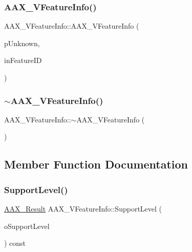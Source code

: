 \subsubsection{\texorpdfstring{AAX\_VFeatureInfo()}{AAX\_VFeatureInfo()}}
{\footnotesize\ttfamily A\+A\+X\+\_\+\+V\+Feature\+Info\+::\+A\+A\+X\+\_\+\+V\+Feature\+Info (\begin{DoxyParamCaption}\item[{\mbox{\hyperlink{a01409}{I\+A\+C\+F\+Unknown}} $\ast$}]{p\+Unknown,  }\item[{const \mbox{\hyperlink{a00392_a53d6cf8a08224b3e813333e411ce798e}{A\+A\+X\+\_\+\+Feature\+\_\+\+U\+ID}} \&}]{in\+Feature\+ID }\end{DoxyParamCaption})\hspace{0.3cm}{\ttfamily [explicit]}}

\mbox{\label{a01917_a96dc62d63f238e0d1c1778c7da749f0a}} 
\subsubsection{\texorpdfstring{$\sim$AAX\_VFeatureInfo()}{~AAX\_VFeatureInfo()}}
{\footnotesize\ttfamily A\+A\+X\+\_\+\+V\+Feature\+Info\+::$\sim$\+A\+A\+X\+\_\+\+V\+Feature\+Info (\begin{DoxyParamCaption}{ }\end{DoxyParamCaption})}



\subsection{Member Function Documentation}
\mbox{\label{a01917_ad801aa95cc3b8956ca589e28d58acbc7}} 
\subsubsection{\texorpdfstring{SupportLevel()}{SupportLevel()}}
{\footnotesize\ttfamily \mbox{\hyperlink{a00392_a4d8f69a697df7f70c3a8e9b8ee130d2f}{A\+A\+X\+\_\+\+Result}} A\+A\+X\+\_\+\+V\+Feature\+Info\+::\+Support\+Level (\begin{DoxyParamCaption}\item[{\mbox{\hyperlink{a00491_aca7bf42860665d5da66f4ac342e761b3}{A\+A\+X\+\_\+\+E\+Support\+Level}} \&}]{o\+Support\+Level }\end{DoxyParamCaption}) const\hspace{0.3cm}{\ttfamily [virtual]}}






